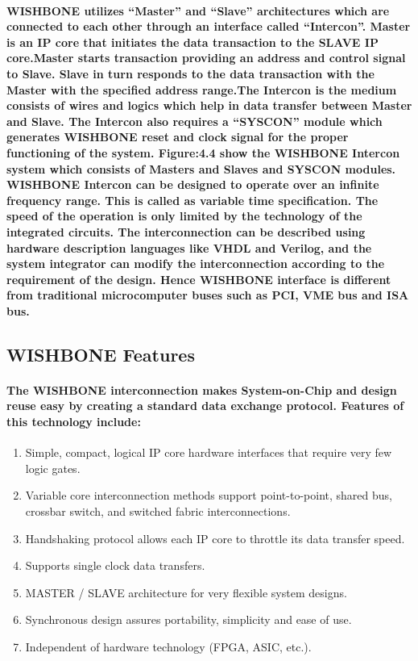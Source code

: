 \documentclass[12pt,a4paper]{report}
\begin{document}
\paragraph{\textrm{\textmd{WISHBONE utilizes “Master” and “Slave” architectures which are connected to
			each other through an interface called “Intercon”. Master is an IP core that initiates the
			data transaction to the SLAVE IP core.Master starts transaction providing an address and control signal to Slave. Slave
			in turn responds to the data transaction with the Master with the specified address range.The Intercon is the medium consists of wires and logics which help in data transfer
			between Master and Slave. The Intercon also requires a “SYSCON” module which
			generates WISHBONE reset and clock signal for the proper functioning of the system.
			Figure:4.4 show the WISHBONE Intercon system which consists of Masters and Slaves
			and SYSCON modules. WISHBONE Intercon can be designed to operate over an infinite
			frequency range. This is called as variable time specification. The speed of the operation
			is only limited by the technology of the integrated circuits. The interconnection can be
			described using hardware description languages like VHDL and Verilog, and the
			system integrator can modify the interconnection according to the requirement of the
			design. Hence WISHBONE interface is different from traditional microcomputer buses
			such as PCI, VME bus and ISA bus. }}}
\subsection{WISHBONE Features }
\paragraph{\textrm{\textmd{The WISHBONE interconnection makes System-on-Chip and design reuse easy by creating a
			standard data exchange protocol. Features of this technology include: }}}
\begin{enumerate}
	\item Simple, compact, logical IP core hardware interfaces that require very few logic gates. 
	\item Variable core interconnection methods support point-to-point, shared bus, crossbar
	switch, and switched fabric interconnections. 
	\item Handshaking protocol allows each IP core to throttle its data transfer speed.
	\item Supports single clock data transfers. 
	\item MASTER / SLAVE architecture for very flexible system designs. 
	\item Synchronous design assures portability, simplicity and ease of use. 
	\item Independent of hardware technology (FPGA, ASIC, etc.). 
\end{enumerate}
\end{document}

